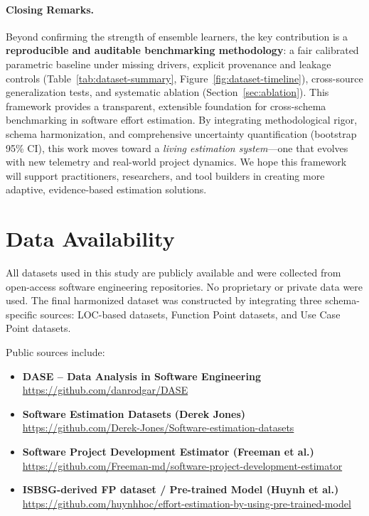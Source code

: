 \documentclass{ieeeaccess}
\begin{document}
\paragraph{Closing Remarks.}
Beyond confirming the strength of ensemble learners,
the key contribution is a \textbf{reproducible and auditable benchmarking methodology}:
a fair calibrated parametric baseline under missing drivers,
explicit provenance and leakage controls (Table~\ref{tab:dataset-summary}, Figure~\ref{fig:dataset-timeline}),
cross-source generalization tests,
and systematic ablation (Section~\ref{sec:ablation}).
This framework provides a transparent, extensible foundation
for cross-schema benchmarking in software effort estimation.
By integrating methodological rigor, schema harmonization,
and comprehensive uncertainty quantification (bootstrap 95\% CI),
this work moves toward a \textit{living estimation system}—one that evolves
with new telemetry and real-world project dynamics.
We hope this framework will support practitioners, researchers,
and tool builders in creating more adaptive,
evidence-based estimation solutions.











\section*{Data Availability}
\raggedright
All datasets used in this study are publicly available and were collected from
open-access software engineering repositories. No proprietary or private data were used.
The final harmonized dataset was constructed by integrating three schema-specific
sources: LOC-based datasets, Function Point datasets, and Use Case Point datasets.

Public sources include:

\begin{itemize}
    \item \textbf{DASE – Data Analysis in Software Engineering}  
    \url{https://github.com/danrodgar/DASE}

    \item \textbf{Software Estimation Datasets (Derek Jones)}  
    \url{https://github.com/Derek-Jones/Software-estimation-datasets}

    \item \textbf{Software Project Development Estimator (Freeman et al.)}  
    \url{https://github.com/Freeman-md/software-project-development-estimator}

    \item \textbf{ISBSG-derived FP dataset / Pre-trained Model (Huynh et al.)}  
    \url{https://github.com/huynhhoc/effort-estimation-by-using-pre-trained-model}
\end{itemize}
\end{document}
